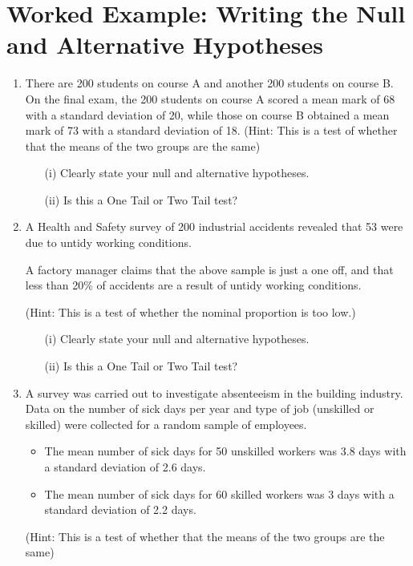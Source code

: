 
\section*{Worked Example: Writing the Null and Alternative Hypotheses}
\begin{enumerate}
\item There are 200 students on course A and another 200 students on course B.  On the final exam, the 200 students on course A scored a mean mark of 68 with a standard deviation of 20, while those on course B obtained a mean mark of 73 with a standard deviation of 18.
	(Hint: This is a test of whether that the means of the two groups are the same)
	
	\begin{itemize}
		\item[(i)] Clearly state your null and alternative hypotheses.
		\item[(ii)] Is this a One Tail or Two Tail test?
	\end{itemize}
	
\item A Health and Safety survey of 200 industrial accidents revealed that 53
were due to untidy working conditions.

A factory manager claims that the above sample is just a one off, and that less than 20\% of accidents are a result of untidy working conditions.

(Hint: This is a test of whether the nominal proportion is too low.)
\begin{itemize}
	\item[(i)] Clearly state your null and alternative hypotheses.
	\item[(ii)] Is this a One Tail or Two Tail test?
\end{itemize}

\item A survey was carried out to investigate absenteeism in the building industry.
Data on the number of sick days per year and type of job (unskilled or skilled)
were collected for a random sample of employees.
\begin{itemize} 	
	\item The mean number of sick days for 50 unskilled workers was 3.8 days with a standard deviation of 2.6 days.
	\item The mean number of sick days for 60 skilled workers was 3 days with a standard deviation of 2.2 days.

\end{itemize}	
(Hint: This is a test of whether that the means of the two groups are the same)


\end{enumerate}
